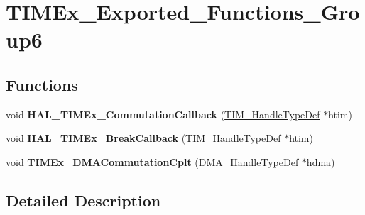 \hypertarget{group___t_i_m_ex___exported___functions___group6}{}\section{T\+I\+M\+Ex\+\_\+\+Exported\+\_\+\+Functions\+\_\+\+Group6}
\label{group___t_i_m_ex___exported___functions___group6}
\subsection*{Functions}
\begin{DoxyCompactItemize}
\item 
\mbox{\label{group___t_i_m_ex___exported___functions___group6_ga5b08c045ccb306ada81a0c8436a0c1ec}} 
void {\bfseries H\+A\+L\+\_\+\+T\+I\+M\+Ex\+\_\+\+Commutation\+Callback} (\mbox{\hyperlink{struct_t_i_m___handle_type_def}{T\+I\+M\+\_\+\+Handle\+Type\+Def}} $\ast$htim)
\item 
\mbox{\label{group___t_i_m_ex___exported___functions___group6_ga2d868a55ca7c62c4a5ef85dec514402c}} 
void {\bfseries H\+A\+L\+\_\+\+T\+I\+M\+Ex\+\_\+\+Break\+Callback} (\mbox{\hyperlink{struct_t_i_m___handle_type_def}{T\+I\+M\+\_\+\+Handle\+Type\+Def}} $\ast$htim)
\item 
\mbox{\label{group___t_i_m_ex___exported___functions___group6_gaf473fa38254d62a74a006a781fe0aeb8}} 
void {\bfseries T\+I\+M\+Ex\+\_\+\+D\+M\+A\+Commutation\+Cplt} (\mbox{\hyperlink{group___d_m_a___exported___types_ga41b754a906b86bce54dc79938970138b}{D\+M\+A\+\_\+\+Handle\+Type\+Def}} $\ast$hdma)
\end{DoxyCompactItemize}


\subsection{Detailed Description}
